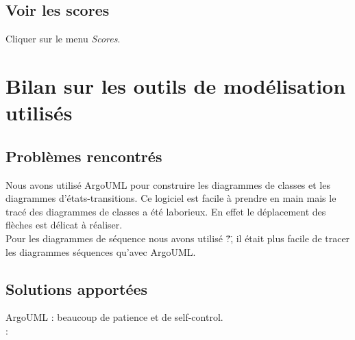 \documentclass[12pt,a4paper]{report}
\begin{document}
\section*{Voir les scores}
Cliquer sur le menu {\it Scores}.

\maketitle
\chapter*{Bilan sur les outils de modélisation utilisés}

\section*{Problèmes rencontrés}
Nous avons utilisé ArgoUML pour construire les diagrammes de classes et les diagrammes d'états-transitions. Ce logiciel est facile à prendre en main mais le tracé des diagrammes de classes a été laborieux. En effet le déplacement des flèches est délicat à réaliser.
\\Pour les diagrammes de séquence nous avons utilisé \"?\", il était plus facile de tracer les diagrammes séquences qu'avec ArgoUML.


\section*{Solutions apportées}
ArgoUML : beaucoup de patience et de self-control.
\\:
\end{document}
